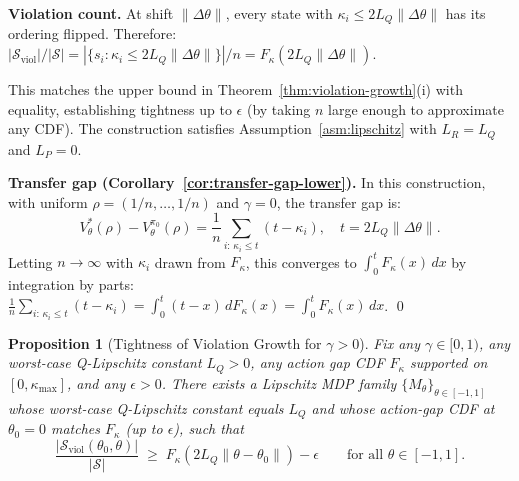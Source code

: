 \documentclass{article}
\newtheorem{proposition}{Proposition}
\newcommand{\cS}{\mathcal{S}}
\newcommand{\Sviol}{\mathcal{S}_{\mathrm{viol}}}
\begin{document}
\textbf{Violation count.} At shift $\|\Delta\theta\|$, every state with $\kappa_i \leq 2L_Q\|\Delta\theta\|$ has its ordering flipped. Therefore:
$|\Sviol| / |\cS| = |\{s_i : \kappa_i \leq 2L_Q\|\Delta\theta\|\}| / n = F_\kappa(2L_Q\|\Delta\theta\|)$.

This matches the upper bound in Theorem~\ref{thm:violation-growth}(i) with equality, establishing tightness up to $\epsilon$ (by taking $n$ large enough to approximate any CDF). The construction satisfies Assumption~\ref{asm:lipschitz} with $L_R = L_Q$ and $L_P = 0$.

\textbf{Transfer gap (Corollary~\ref{cor:transfer-gap-lower}).} In this construction, with uniform $\rho = (1/n, \ldots, 1/n)$ and $\gamma = 0$, the transfer gap is:
\begin{equation}
V^*_\theta(\rho) - V^{\pi_0}_\theta(\rho) = \frac{1}{n}\sum_{i:\, \kappa_i \leq t} (t - \kappa_i), \quad t = 2L_Q\|\Delta\theta\|.
\end{equation}
Letting $n \to \infty$ with $\kappa_i$ drawn from $F_\kappa$, this converges to $\int_0^t F_\kappa(x)\,dx$ by integration by parts: $\frac{1}{n}\sum_{i:\,\kappa_i \leq t}(t - \kappa_i) = \int_0^t (t - x)\,dF_\kappa(x) = \int_0^t F_\kappa(x)\,dx$. \qed

\begin{proposition}[Tightness of Violation Growth for $\gamma > 0$]
\label{prop:tight-growth-gamma}
Fix any $\gamma \in [0, 1)$, any worst-case Q-Lipschitz constant $L_Q > 0$, any action gap CDF $F_\kappa$ supported on $[0, \kappa_{\max}]$, and any $\epsilon > 0$. There exists a Lipschitz MDP family $\{M_\theta\}_{\theta \in [-1,1]}$ whose worst-case Q-Lipschitz constant equals $L_Q$ and whose action-gap CDF at $\theta_0 = 0$ matches $F_\kappa$ (up to $\epsilon$), such that
\[
\frac{|\Sviol(\theta_0, \theta)|}{|\cS|} \;\geq\; F_\kappa\!\left(2L_Q\|\theta - \theta_0\|\right) - \epsilon
\qquad \text{for all } \theta \in [-1,1].
\]
\end{proposition}
\end{document}
